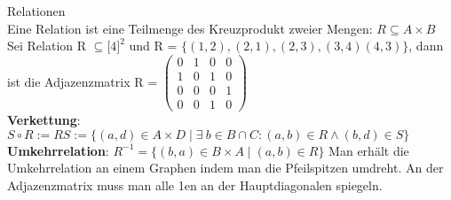 \documentclass[11pt]{article}
\begin{document}
Relationen \\
Eine Relation ist eine Teilmenge des Kreuzprodukt zweier Mengen: $R \subseteq A \times B$ \\
Sei Relation R $\subseteq {[}4{]}^2$ und R = $\{(1,2), (2,1), (2,3), (3,4) (4,3)\}$, dann ist die Adjazenzmatrix R = $\begin{pmatrix} 0 & 1 & 0 & 0 \\ 1 & 0 & 1 & 0 \\ 0 & 0 & 0 & 1 \\ 0 & 0 & 1 & 0 \end{pmatrix} $ \\
{\bfseries Verkettung}: $S \circ R := RS := \{(a,d) \in A \times D \mid \exists ~ b \in B \cap C\colon (a,b) \in R \land (b,d) \in S\}$ \\
{\bfseries Umkehrrelation}: $R^{-1} = \{(b,a) \in B \times A \mid (a,b) \in R\}$ Man erh{\"a}lt die Umkehrrelation an einem Graphen indem man die Pfeilspitzen umdreht. An der Adjazenzmatrix muss man alle 1en an der Hauptdiagonalen spiegeln. \\
\end{document}
